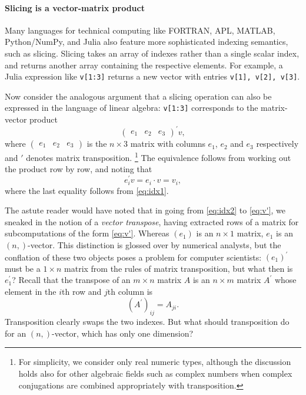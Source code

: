 \paragraph{Slicing is a vector-matrix product}
Many languages for technical computing like FORTRAN, APL, MATLAB, Python/NumPy,
and Julia also feature more sophisticated indexing semantics, such as slicing.
Slicing takes an array of indexes rather than a single scalar index, and returns
another array containing the respective elements. For example, a Julia
expression like \lstinline|v[1:3]| returns a new vector with entries
\lstinline|v[1], v[2], v[3]|.

Now consider the analogous argument that a slicing operation can also be
expressed in the language of linear algebra: \lstinline|v[1:3]| corresponds to
the matrix-vector product
\begin{equation}
	\begin{pmatrix}e_1 & e_2 & e_3\end{pmatrix}^\prime v,\label{eq:idx2}
\end{equation}
where $\begin{pmatrix}e_1 & e_2 & e_3\end{pmatrix}$ is the $n \times 3$
matrix with columns $e_1$, $e_2$ and $e_3$ respectively and $'$ denotes matrix
transposition.%
\footnote{For simplicity, we consider only real numeric types, although the
discussion holds also for other algebraic fields such as complex numbers when
complex conjugations are combined appropriately with transposition.}
The equivalence follows from working out the product row by row,
and noting that
\begin{equation}
	e_i^\prime v = e_i \cdot v = v_i,\label{eq:v'}
\end{equation}
where the last equality follows from \eqref{eq:idx1}.

The astute reader would have noted that in going from \eqref{eq:idx2} to
\eqref{eq:v'}, we sneaked in the notion of a \textit{vector transpose}, having
extracted rows of a matrix for subcomputations of the form \eqref{eq:v'}.
Whereas $(e_1)$ is an $n \times 1$ matrix, $e_1$ is an $(n,)$-vector. This
distinction is glossed over by numerical analysts, but the conflation of these
two objects poses a problem for computer scientists: ${(e_1)}^\prime$ must be
a $1 \times n$ matrix from the rules of matrix transposition, but what then is
$e_1^\prime$? Recall that the transpose of an $m \times n$ matrix $A$ is an
$n \times m$ matrix $A^\prime$ whose element in the $i$th row and $j$th column
is
\begin{equation}
	{\left(A^\prime\right)}_{ij} = A_{ji}.\label{eq:A'}
\end{equation}
Transposition clearly swaps the two indexes. But what should transposition do
for an $(n,)$-vector, which has only one dimension?

